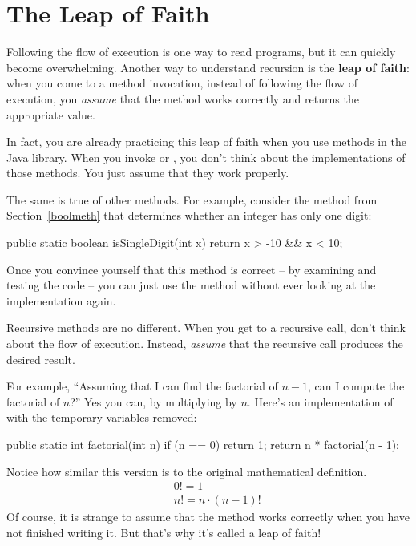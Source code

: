 \section{The Leap of Faith}
\label{leap_of_faith}


Following the flow of execution is one way to read programs, but it can quickly become overwhelming.
Another way to understand recursion is the {\bf leap of faith}:
when you come to a method invocation, instead of following the flow of execution, you {\em assume} that the method works correctly and returns the appropriate value.

In fact, you are already practicing this leap of faith when you use methods in the Java library.
When you invoke  or , you don't think about the implementations of those methods.
You just assume that they work properly.

The same is true of other methods.
For example, consider the method from Section~\ref{boolmeth} that determines whether an integer has only one digit:

\begin{code}
public static boolean isSingleDigit(int x) {
    return x > -10 && x < 10;
}
\end{code}

Once you convince yourself that this method is correct -- by examining and testing the code -- you can just use the method without ever looking at the implementation again.

Recursive methods are no different.
When you get to a recursive call, don't think about the flow of execution.
Instead, {\em assume} that the recursive call produces the desired result.

For example, ``Assuming that I can find the factorial of $n-1$, can I compute the factorial of $n$?''
Yes you can, by multiplying by $n$.  Here's an implementation of  with the temporary variables removed:

\begin{code}
public static int factorial(int n) {
    if (n == 0) {
        return 1;
    }
    return n * factorial(n - 1);
}
\end{code}

Notice how similar this version is to the original mathematical definition.
%
\begin{eqnarray*}
&&  0! = 1 \\
&&  n! = n \cdot(n-1)!
\end{eqnarray*}
%
Of course, it is strange to assume that the method works correctly when you have not finished writing it.
But that's why it's called a leap of faith!


